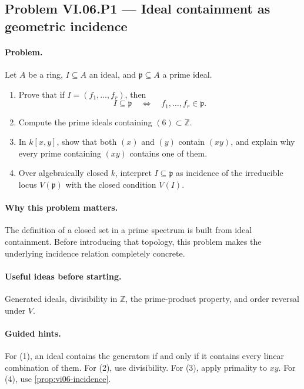 \subsection*{Problem VI.06.P1 --- Ideal containment as geometric incidence}
\label{prob:vi-06-p1}

\paragraph{Problem.}
Let \(A\) be a ring, \(I\subseteq A\) an ideal, and \(\mathfrak p\subseteq A\) a prime
ideal.
\begin{enumerate}
\item Prove that if \(I=(f_1,\dots,f_r)\), then
\[
I\subseteq\mathfrak p
\quad\Longleftrightarrow\quad
f_1,\dots,f_r\in\mathfrak p.
\]
\item Compute the prime ideals containing \((6)\subset\mathbb Z\).
\item In \(k[x,y]\), show that both \((x)\) and \((y)\) contain \((xy)\), and explain why every prime containing \((xy)\) contains one of them.
\item Over algebraically closed \(k\), interpret \(I\subseteq\mathfrak p\) as incidence of the irreducible locus \(V(\mathfrak p)\) with the closed condition \(V(I)\).
\end{enumerate}

\ifdefined\FullProblemDossiers
\paragraph{Why this problem matters.}
The definition of a closed set in a prime spectrum is built from ideal containment.  Before
introducing that topology, this problem makes the underlying incidence relation completely
concrete.

\paragraph{Useful ideas before starting.}
Generated ideals, divisibility in \(\mathbb Z\), the prime-product property, and order
reversal under \(V\).

\paragraph{Guided hints.}
For (1), an ideal contains the generators if and only if it contains every linear
combination of them.  For (2), use divisibility.  For (3), apply primality to \(xy\).  For
(4), use \cref{prop:vi06-incidence}.

